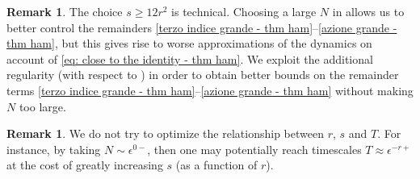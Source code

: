 \documentclass[a4paper,10pt,reqno]{article}
\theoremstyle{definition}
\theoremstyle{plain}
\theoremstyle{plain}
\theoremstyle{definition}
\theoremstyle{plain}
\theoremstyle{plain}
\theoremstyle{plain}
\theoremstyle{definition}
\newtheorem{rem}[definition]{Remark}
\theoremstyle{definition}
\begin{document}
\begin{rem} \label{rem dyn 1}
The choice $s \ge 12 r^2$ is technical.
Choosing a large $N$ in  allows us to better control the remainders \eqref{terzo indice grande - thm ham}--\eqref{azione grande - thm ham}, but this gives rise to worse approximations of the dynamics on account of \eqref{eq: close to the identity - thm ham}. We exploit the additional regularity (with respect to ) in order to obtain better bounds on the remainder terms \eqref{terzo indice grande - thm ham}--\eqref{azione grande - thm ham} without making $N$ too large.
\end{rem}

\begin{rem} \label{rem dyn 2}
We do not try to optimize the relationship between $r$, $s$ and $T$. For instance, by taking $N\sim \epsilon^{0-}$, then one may potentially reach timescales $T\approx \epsilon^{-r+}$ at the cost of greatly increasing $s$ (as a function of $r$).
\end{rem}
\end{document}

